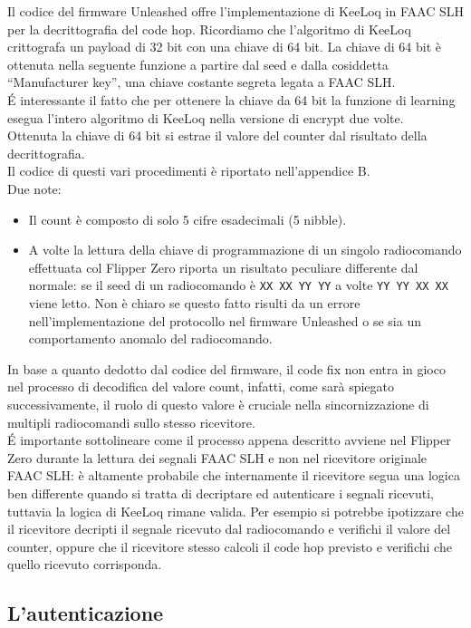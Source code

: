 Il codice del firmware Unleashed offre l’implementazione di KeeLoq in FAAC SLH per la decrittografia del code hop. Ricordiamo che l’algoritmo di KeeLoq crittografa un payload di 32 bit con una chiave di 64 bit. La chiave di 64 bit è ottenuta nella seguente funzione a partire dal seed e dalla cosiddetta “Manufacturer key”, una chiave costante segreta legata a FAAC SLH.\\
É interessante il fatto che per ottenere la chiave da 64 bit la funzione di learning esegua l’intero algoritmo di KeeLoq nella versione di encrypt due volte.\\
Ottenuta la chiave di 64 bit si estrae il valore del counter dal risultato della decrittografia.\\
Il codice di questi vari procedimenti è riportato nell'appendice B.\\
Due note:
\begin{itemize}
  \item Il count è composto di solo 5 cifre esadecimali (5 nibble).
  \item A volte la lettura della chiave di programmazione di un singolo radiocomando effettuata col Flipper Zero riporta un risultato peculiare differente dal normale: se il seed di un radiocomando è \texttt{XX XX YY YY} a volte \texttt{YY YY XX XX} viene letto. Non è chiaro se questo fatto risulti da un errore nell’implementazione del protocollo nel firmware Unleashed o se sia un comportamento anomalo del radiocomando.
\end{itemize}
In base a quanto dedotto dal codice del firmware, il code fix non entra in gioco nel processo di decodifica del valore count, infatti, come sarà spiegato successivamente, il ruolo di questo valore è cruciale nella sincornizzazione di multipli radiocomandi sullo stesso ricevitore.\\
É importante sottolineare come il processo appena descritto avviene nel Flipper Zero durante la lettura dei segnali FAAC SLH e non nel ricevitore originale FAAC SLH: è altamente probabile che internamente il ricevitore segua una logica ben differente quando si tratta di decriptare ed autenticare i segnali ricevuti, tuttavia la logica di KeeLoq rimane valida. Per esempio si potrebbe ipotizzare che il ricevitore decripti il segnale ricevuto dal radiocomando e verifichi il valore del counter, oppure che il ricevitore stesso calcoli il code hop previsto e verifichi che quello ricevuto corrisponda.\\

\subsection{L'autenticazione}
\label{sub:auth}

